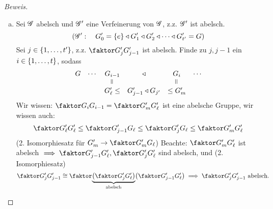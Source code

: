 \documentclass[a4paper]{report}
\begin{document}
\begin{prop}
\begin{proof}[Beweis]
\begin{enumerate}[(a)]
    \item Sei $\mathscr{G}$ abelsch und $\mathscr{G}'$ eine Verfeinerung von $\mathscr{G}$, z.z. $\mathscr{G}'$ ist abelsch.
          \[(\mathscr{G}' :\quad G_{0}' = \{e\} \triangleleft G_{1}' \triangleleft G_{2}' \triangleleft \cdots \triangleleft G_{t'}' = G)\]
          Sei $j \in \{1, \ldots, t'\}$, z.z. $\fak{G_{j}'}{G_{j-1}'}$ ist abelsch. Finde zu $j, j-1$ ein $i \in \{1, \ldots, t\}$, sodass
          \[\begin{matrix}
              G & \cdots & G_{i-1} & \triangleleft & G_{i} & \cdots \\
                & & \rotatebox{90}{=} & &\rotatebox{90}{=} & \\
                & & G_{\ell}' \le & G_{j-1}' \triangleleft G_{j'} & \le G'_{m}\\
            \end{matrix}
          \]
          Wir wissen: $\fak{G_{i}}{G_{i-1}} = \fak{G'_{m}}{G'_{\ell}}$ ist eine abelsche Gruppe, wir wissen auch:
          \[\fak{G_{\ell}'}{G_{\ell}'} \le \fak{G_{j-1}'}{G_{\ell}}\le \fak{G_{j}'}{G_{\ell}} \le \fak{G'_{m}}{G'_{\ell}}\] (2. Isomorphiesatz für $G_{m}' \to \fak{G'_{m}}{G_{\ell}}$) Beachte: $\fak{G'_{m}}{G'_{\ell}}$ ist abelsch $\implies \fak{G'_{j-1}}{G'_{\ell}}, \fak{G'_{j}}{G'_{\ell}}$ sind abelsch, und (2. Isomorphiesatz)
          \[\fak{G'_{j}}{G'_{j-1}} \cong \fak{\ubr{\l(\fak{G'_{j}}{G'_{\ell}}\r)}_{\text{abelsch}}}{\l(\fak{G'_{j-1}}{G'_{\ell}}\r)} \imp \fak{G_{j}'}{G_{j-1}'} \text{ abelsch. } \qedhere\]
  \end{enumerate}
\end{proof}
\end{prop}
\end{document}
